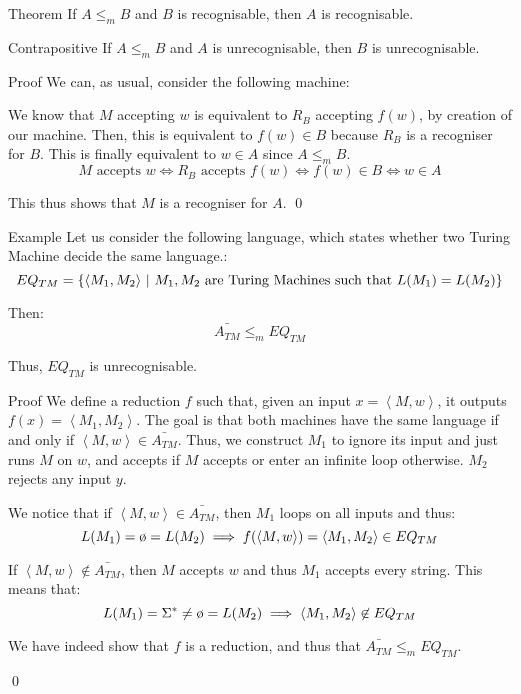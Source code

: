 \documentclass[a4paper]{article}
\begin{document}
\begin{parag}{Theorem}
    If $A \leq_m B$ and $B$ is recognisable, then $A$ is recognisable.

    \begin{subparag}{Contrapositive}
        If $A \leq_m B$ and $A$ is unrecognisable, then $B$ is unrecognisable.
    \end{subparag}
    
    \begin{subparag}{Proof}
        We can, as usual, consider the following machine:

        We know that $M$ accepting $w$ is equivalent to $R_B$ accepting $f\left(w\right)$, by creation of our machine. Then, this is equivalent to $f\left(w\right) \in B$ because $R_B$ is a recogniser for $B$. This is finally equivalent to $w \in A$ since $A \leq_m B$.
        \[M \text{ accepts } w \iff R_B \text{ accepts } f\left(w\right) \iff f\left(w\right) \in B \iff w \in A\]

        This thus shows that $M$ is a recogniser for $A$.
        \qed
    \end{subparag}
\end{parag}


\begin{parag}{Example}
    Let us consider the following language, which states whether two Turing Machine decide the same language.: 
    \[EQ_{TM} = \left\{\left\langle M_1, M_2 \right\rangle \suchthat M_1, M_2 \text{ are Turing Machines such that } L\left(M_1\right) = L\left(M_2\right)\right\}\]
    
    Then: 
    \[\bar{A_{TM}} \leq_m EQ_{TM}\]
    
    Thus, $EQ_{TM}$ is unrecognisable.

    \begin{subparag}{Proof}
        We define a reduction $f$ such that, given an input $x = \left\langle M, w \right\rangle$, it outputs $f\left(x\right) = \left\langle M_1, M_2 \right\rangle$. The goal is that both machines have the same language if and only if $\left\langle M, w \right\rangle \in \bar{A_{TM}}$. Thus, we construct $M_1$ to ignore its input and just runs $M$ on $w$, and accepts if $M$ accepts or enter an infinite loop otherwise. $M_2$ rejects any input $y$.

        We notice that if $\left\langle M, w \right\rangle \in \bar{A_{TM}}$, then $M_1$ loops on all inputs and thus: 
        \[L\left(M_1\right) = \o = L\left(M_2\right) \implies f\left(\left\langle M, w \right\rangle\right) = \left\langle M_1, M_2 \right\rangle \in EQ_{TM}\]
        
        If $\left\langle M, w \right\rangle \not \in \bar{A_{TM}}$, then $M$ accepts $w$ and thus $M_1$ accepts every string. This means that: 
        \[L\left(M_1\right) = \Sigma^* \neq \o = L\left(M_2\right) \implies \left\langle M_1, M_2 \right\rangle \not\in EQ_{TM}\]
        
        We have indeed show that $f$ is a reduction, and thus that $\bar{A_{TM}} \leq_m EQ_{TM}$.

        \qed
    \end{subparag}
\end{parag}
\end{document}
